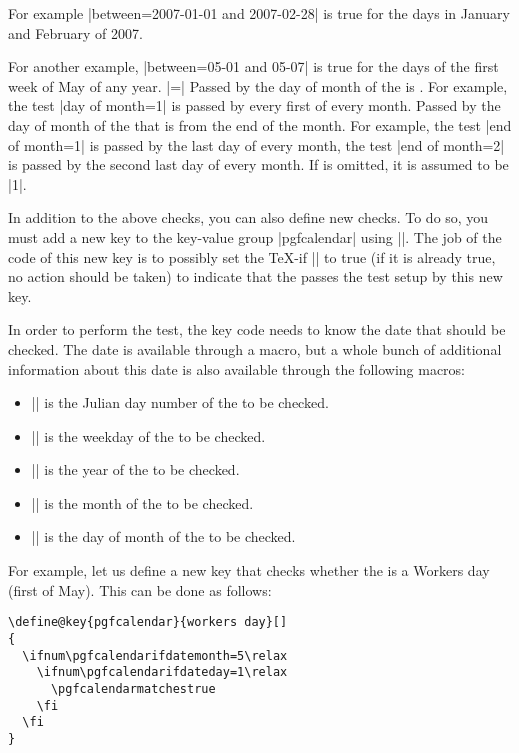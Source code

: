 \begin{command}{\pgfcalendarifdate{}}
\begin{itemize}
  For example |between=2007-01-01 and 2007-02-28| is true for the days
  in January and February of 2007.

  For another example, |between=05-01 and 05-07| is true for the
  days of the first week of May of any year.
  |=| Passed by the day
  of month of the  is . For example, the test
  |day of month=1| is passed by every first of every month.
   Passed by
  the day of month of the  that is  from the
  end of the month. For example, the test |end of month=1| is passed
  by the last day of every month, the test |end of month=2| is passed
  by the second last day of every month. If  is omitted,
  it is assumed to be |1|.
  \end{itemize}

  In addition to the above checks, you can also define new checks. To
  do so, you must add a new key to the key-value group |pgfcalendar|
  using ||. The job of the code of this new key is to
  possibly set the \TeX-if |\ifpgfcalendarmatches| to true (if it is
  already true, no action should be taken) to indicate that the
   passes the test setup by this new key.

  In order to perform the test, the key code needs to know the date
  that should be checked. The date is available through a macro, but a
  whole bunch of additional information about this date is also
  available through the following macros:
  \begin{itemize}
  \item |\pgfcalendarifdatejulian|
    is the Julian day number of the  to be checked.
  \item |\pgfcalendarifdateweekday|
    is the weekday of the  to be checked.
  \item |\pgfcalendarifdateyear|
    is the year of the  to be checked.
  \item |\pgfcalendarifdatemonth|
    is the month of the  to be checked.
  \item |\pgfcalendarifdateday|
    is the day of month of the  to be checked.
  \end{itemize}

  For example, let us define a new key that checks whether the
   is a Workers day (first of May). This can be done as
  follows:
\begin{verbatim}
\define@key{pgfcalendar}{workers day}[]
{
  \ifnum\pgfcalendarifdatemonth=5\relax
    \ifnum\pgfcalendarifdateday=1\relax
      \pgfcalendarmatchestrue
    \fi
  \fi
}
\end{verbatim}
\end{command}


